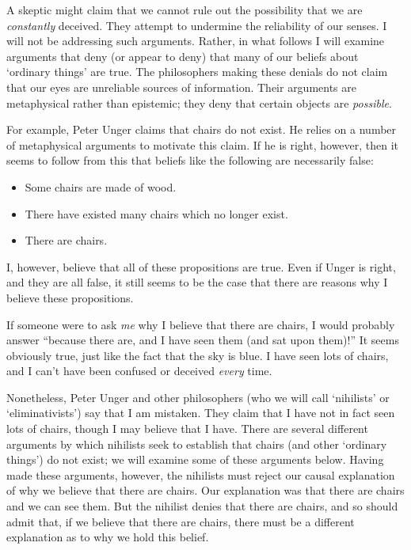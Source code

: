 \documentclass[11pt]{article}
\begin{document}
\begin{spacing}{1.5}
A skeptic might claim that we cannot rule out the possibility that we
are {\em constantly} deceived.  They attempt to undermine the
reliability of our senses.  I will not be addressing such arguments.
Rather, in what follows I will examine arguments that deny (or appear
to deny) that many of our beliefs about `ordinary things' are true.
The philosophers making these denials do not claim that our eyes are
unreliable sources of information.  Their arguments are metaphysical
rather than epistemic; they deny that certain objects are {\em
  possible}.  

For example, Peter Unger claims that chairs do not exist.  He relies
on a number of metaphysical arguments to motivate this claim.  If he
is right, however, then it seems to follow from this that beliefs like
the following are necessarily false:

\begin{itemize}
  \item Some chairs are made of wood.
  \item There have existed many chairs which no longer exist.
  \item There are chairs.
\end{itemize}

I, however, believe that all of these propositions are true.  Even if
Unger is right, and they are all false, it still seems to be the case
that there are reasons why I believe these propositions.

If someone were to ask {\em me} why I believe that there are chairs, I
would probably answer ``because there are, and I have seen them (and
sat upon them)!''  It seems obviously true, just like the fact that
the sky is blue.  I have seen lots of chairs, and I can't have been
confused or deceived {\em every} time.

Nonetheless, Peter Unger and other philosophers (who we will call
`nihilists' or `eliminativists') say that I am mistaken.  They claim
that I have not in fact seen lots of chairs, though I may believe that
I have.  There are several different arguments by which nihilists seek
to establish that chairs (and other `ordinary things') do not exist;
we will examine some of these arguments below.  Having made these
arguments, however, the nihilists must reject our causal explanation
of why we believe that there are chairs.  Our explanation was that
there are chairs and we can see them.  But the nihilist denies that
there are chairs, and so should admit that, if we believe that there
are chairs, there must be a different explanation as to why we hold
this belief.


\end{spacing}
\end{document}
